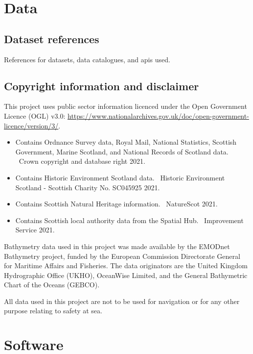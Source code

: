 \chapter{Data \label{app:data}}

\section*{Dataset references}

References for datasets, data catalogues, and \glspl{api} used.

\printbibliography[notcategory=cited,heading=none,keyword=data]

\section*{Copyright information and disclaimer}

This project uses public sector information licenced under the Open Government Licence (OGL) v3.0:
\url{https://www.nationalarchives.gov.uk/doc/open-government-licence/version/3/}.

\begin{itemize}[noitemsep]
  \item Contains Ordnance Survey data, Royal Mail, National Statistics, Scottish Government, Marine Scotland, and National Records of Scotland data. \textcopyright~Crown copyright and database right 2021.
  \item Contains Historic Environment Scotland data. \textcopyright~Historic Environment Scotland - Scottish Charity No. SC045925 2021.
  \item Contains Scottish Natural Heritage information. \textcopyright~NatureScot 2021.
  \item Contains Scottish local authority data from the Spatial Hub. \textcopyright~Improvement Service 2021.
\end{itemize}

Bathymetry data used in this project was made available by the EMODnet Bathymetry project, funded by the European Commission Directorate General for Maritime Affairs and Fisheries. The data originators are the United Kingdom Hydrographic Office (UKHO), OceanWise Limited, and the General Bathymetric Chart of the Oceans (GEBCO).

All data used in this project are not to be used for navigation or for any other purpose relating to safety at sea.

\chapter{Software \label{app:soft}}

